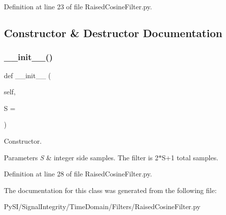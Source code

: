 Definition at line 23 of file Raised\+Cosine\+Filter.\+py.



\subsection{Constructor \& Destructor Documentation}
\mbox{\label{classSignalIntegrity_1_1TimeDomain_1_1Filters_1_1RaisedCosineFilter_1_1RaisedCosineFilter_a59c1eb244c4627d0d84564a3dffb5687}} 
\subsubsection{\texorpdfstring{\+\_\+\+\_\+init\+\_\+\+\_\+()}{\_\_init\_\_()}}
{\footnotesize\ttfamily def \+\_\+\+\_\+init\+\_\+\+\_\+ (\begin{DoxyParamCaption}\item[{}]{self,  }\item[{}]{S = {} }\end{DoxyParamCaption})}



Constructor. 


\begin{DoxyParams}{Parameters}
{\em S} & integer side samples. The filter is 2$\ast$\+S+1 total samples. \\
\hline
\end{DoxyParams}


Definition at line 28 of file Raised\+Cosine\+Filter.\+py.



The documentation for this class was generated from the following file\+:\begin{DoxyCompactItemize}
\item 
Py\+S\+I/\+Signal\+Integrity/\+Time\+Domain/\+Filters/Raised\+Cosine\+Filter.\+py\end{DoxyCompactItemize}
